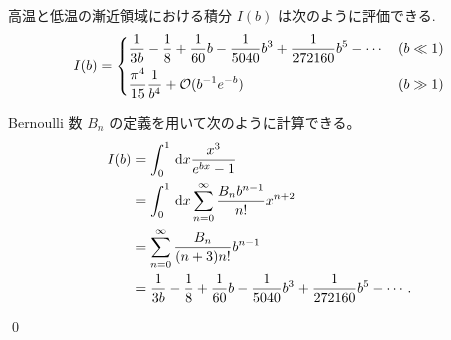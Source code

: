 \documentclass[uplatex,diffipdfmx,a4paper,11pt]{jlreq}
\makeatletter
\numberwithin{equation}{section}
\theoremstyle{definition}
\renewenvironment{proof}[1][\proofname]{\par
  \normalfont
  \topsep6\p@\@plus6\p@ \trivlist
  \item[\hskip\labelsep{\bfseries #1}\@addpunct{\bfseries}]\ignorespaces\quad\par
}{%
  \qed\endtrivlist\@endpefalse
}
\renewcommand\proofname{証明}
\makeatother
\begin{document}
\begin{theorem}
  高温と低温の漸近領域における積分 $I(b)$ は次のように評価できる.
  \begin{align}
    I(b) =
    \begin{dcases}
      \frac{1}{3b} - \frac{1}{8} + \frac{1}{60}b - \frac{1}{5040}b^3 + \frac{1}{272160}b^5 - \cdots & (b\ll 1) \\
      \frac{\pi^4}{15}\frac{1}{b^4} + \mathcal{O}(b^{-1}e^{-b})                                     & (b\gg 1)
    \end{dcases}
  \end{align}
\end{theorem}
\begin{proof}
  Bernoulli 数 $B_n$ の定義を用いて次のように計算できる。
  \begin{align}
    I(b) & = \int_0^1\dl{x}\frac{x^3}{e^{bx} - 1}                                                           \\
         & = \int_0^1\dl{x}\sum_{n=0}^{\infty}\frac{B_n b^{n-1}}{n!}x^{n+2}                                 \\
         & = \sum_{n=0}^{\infty}\frac{B_n}{(n + 3)n!}b^{n-1}                                                \\
         & = \frac{1}{3b} - \frac{1}{8} + \frac{1}{60}b - \frac{1}{5040}b^3 + \frac{1}{272160}b^5 - \cdots.
  \end{align}


\end{proof}
\end{document}
